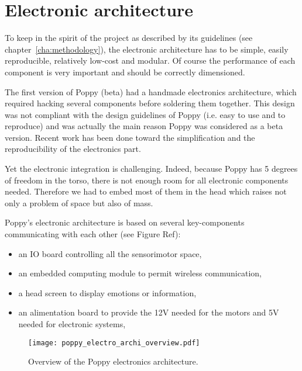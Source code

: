 
\section{Electronic architecture} %
\label{sec:poppy-electronic}

To keep in the spirit of the project as described by its guidelines (see chapter~\ref{cha:methodology}), the electronic architecture has to be simple, easily reproducible, relatively low-cost and modular. Of course the performance of each component is very important and should be correctly dimensioned.

The first version of Poppy (beta) had a handmade electronics architecture, which required hacking several components before soldering them together. This design was not compliant with the design guidelines of Poppy (i.e. easy to use and to reproduce) and was actually the main reason Poppy was considered as a beta version. Recent work has been done toward the simplification and the reproducibility of the electronics part.

Yet the electronic integration is challenging. Indeed, because Poppy has 5 degrees of freedom in the torso, there is not enough room for all electronic components needed. Therefore we had to embed most of them in the head which raises not only a problem of space but also of mass.

Poppy's electronic architecture is based on several key-components communicating with each other (see Figure Ref):
\begin{itemize}
    \item an IO board controlling all the sensorimotor space,
    \item an embedded computing module to permit wireless communication,
    \item a head screen to display emotions or information,
    \item an alimentation board to provide the 12V needed for the motors and 5V needed for electronic systems,
\end{itemize}

\begin{figure}[tb]
    \begin{center}
        \texttt{[image: poppy\_electro\_archi\_overview.pdf]}
    \end{center}
    \caption{Overview of the Poppy electronics architecture.}

\end{figure}

